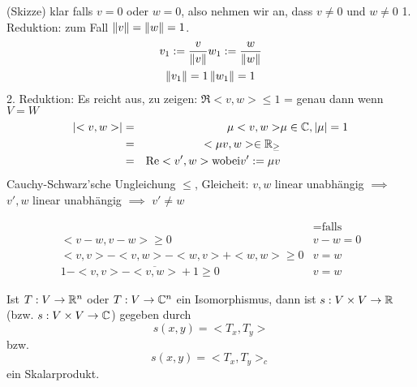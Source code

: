 \begin{Bew}
  (Skizze) klar falls $v=0$ oder $w=0$, also nehmen wir an, dass $v\neq 0$ und $w\neq 0$
  1. Reduktion: zum Fall $\left\| v \right\|=\left\| w \right\|=1$.
  \begin{align*}
    v_1:=\frac{v}{\left\| v \right\|} & w_1:=\frac{w}{\left\| w \right\|}\\
    \left\| v_1 \right\|=1 & \left\| w_1 \right\|=1
  \end{align*}
  2. Reduktion:  Es reicht aus, zu zeigen: $\Re <v,w>\leq 1$ = genau dann wenn $V=W$
  \begin{align*}
    \left| <v,w> \right|&=& \mu<v,w> & \mu\in \mathbb{C}, \left| \mu \right|=1 \\
    &=& <\mu v,w>\in \mathbb{R}_\geq \\
    &=& \operatorname{Re} <v',w> \text{wobei} v':=\mu v
  \end{align*}
  Cauchy-Schwarz'sche Ungleichung $\leq$, Gleicheit: $v,w$ linear unabhängig $\implies$ $v',w$ linear unabhängig $\implies$ $v'\neq w$
\end{Bew}
\begin{Eig}
  \begin{align*}
     & = \text{falls} \\
    <v-w,v-w> \geq 0 & v-w=0\\
    <v,v> - <v,w> - <w,v> + <w,w> \geq 0 & v=w\\
    1-<v,v>-\overline{<v,w>} + 1 \geq 0 & v=w
  \end{align*}
\end{Eig}
\begin{Bsp}
  Ist $T:V\to\mathbb{R}^n$ oder $T:V\to\mathbb{C}^n$ ein Isomorphismus, dann ist $s:V\times V\to\mathbb{R}$ (bzw. $s:V\times V\to\mathbb{C}$) gegeben durch
  \[s(x,y)=<T_x,T_y>\]
  bzw.
  \[s(x,y)=<T_x,T_y>_c\]
  ein Skalarprodukt.
\end{Bsp}

